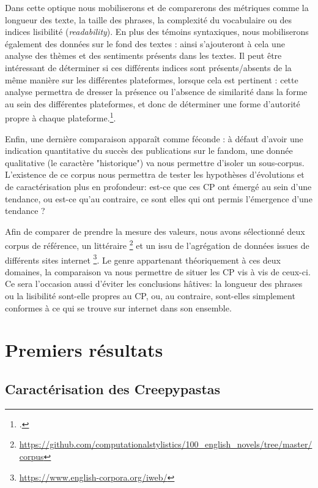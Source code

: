 \documentclass[12pt,a4paper,oneside,titlepage]{book} %
\begin{document}
		Dans cette optique nous mobiliserons et de comparerons des métriques comme la longueur des texte, la taille des phrases, la complexité du vocabulaire ou des indices lisibilité (\textit{readability}). 
		En plus des témoins syntaxiques, nous mobiliserons également des données sur le fond des textes : ainsi s'ajouteront à cela une analyse des thèmes et des sentiments présents dans les textes.
		Il peut être intéressant de déterminer si ces différents indices sont présents/absents de la même manière sur les différentes plateformes, lorsque cela est pertinent : cette analyse permettra de dresser la présence ou l'absence de similarité dans la forme au sein des différentes plateformes, et donc de déterminer une forme d'autorité propre à chaque plateforme.\footcite{mayer_autorite_2017}. 
	
		Enfin, une dernière comparaison apparaît comme féconde : à défaut d'avoir une indication quantitative du succès des publications sur le fandom, une donnée qualitative (le caractère "historique") va nous permettre d'isoler un sous-corpus.  
		L'existence de ce corpus nous permettra de tester les hypothèses d'évolutions et de caractérisation plus en profondeur: est-ce que ces CP ont émergé au sein d'une tendance, ou est-ce qu'au contraire, ce sont elles qui ont permis l'émergence d'une tendance ? 
		
		Afin de comparer de prendre la mesure des valeurs, nous avons sélectionné deux corpus de référence, un littéraire \footnote{\url{https://github.com/computationalstylistics/100_english_novels/tree/master/corpus}} et un issu de l'agrégation de données issues de différents sites internet \footnote{\url{https://www.english-corpora.org/iweb/}}. Le genre appartenant théoriquement à ces deux domaines, la comparaison va nous permettre de situer les CP vis à vis de ceux-ci. Ce sera l'occasion aussi d'éviter les conclusions hâtives: la longueur des phrases ou la lisibilité sont-elle propres au CP, ou, au contraire, sont-elles simplement conformes à ce qui se trouve sur internet dans son ensemble.
		
	\part{Premiers résultats}
	
	\chapter{Caractérisation des Creepypastas}
	
	
\end{document}
